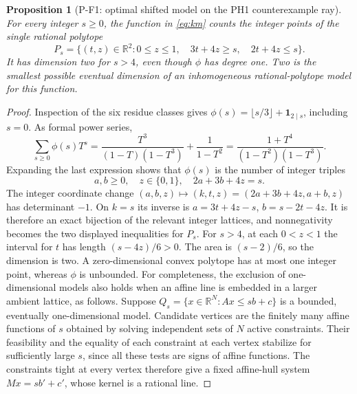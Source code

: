 \documentclass[11pt,a4paper]{article}
\newtheorem{proposition}{Proposition}[section]
\begin{document}
\begin{proposition}[P-F1: optimal shifted model on the PH1 counterexample ray]
\label{prop:shiftedray}
For every integer $s\ge0$, the function in \eqref{eq:km} counts the integer
points of the single rational polytope
\[
 P_s=\{(t,z)\in\mathbb R^2:
 0\le z\le1,\quad 3t+4z\ge s,\quad 2t+4z\le s\}.
 \tag{P-F1}
\]
It has dimension two for $s>4$, even though $\phi$ has degree one.
Two is the smallest possible eventual dimension of an inhomogeneous
rational-polytope model for this function.
\end{proposition}
\begin{proof}
Inspection of the six residue classes gives
$\phi(s)=\lfloor s/3\rfloor+\mathbf1_{2\mid s}$, including $s=0$.
As formal power series,
\[
 \sum_{s\ge0}\phi(s)T^s
 =\frac{T^3}{(1-T)(1-T^3)}+\frac1{1-T^2}
 =\frac{1+T^4}{(1-T^2)(1-T^3)}.
\]
Expanding the last expression shows that $\phi(s)$ is the number of
integer triples
\[
 a,b\ge0,\quad z\in\{0,1\},\quad 2a+3b+4z=s.
\]
The integer coordinate change
$(a,b,z)\mapsto(k,t,z)=(2a+3b+4z,a+b,z)$ has determinant $-1$.
On $k=s$ its inverse is
$a=3t+4z-s$, $b=s-2t-4z$.
It is therefore an exact bijection of the relevant integer lattices,
and nonnegativity becomes the two displayed inequalities for $P_s$.
For $s>4$, at each $0<z<1$ the interval for $t$ has length
$(s-4z)/6>0$. The area is $(s-2)/6$, so the dimension is two.
A zero-dimensional convex polytope has at most one integer point,
whereas $\phi$ is unbounded. For completeness, the exclusion of
one-dimensional models also holds when an affine line is embedded in
a larger ambient lattice, as follows. Suppose
$Q_s=\{x\in\mathbb R^N:Ax\le sb+c\}$ is a bounded, eventually
one-dimensional model. Candidate vertices are the finitely many affine
functions of $s$ obtained by solving independent sets of $N$ active
constraints. Their feasibility and the equality of each constraint at
each vertex stabilize for sufficiently large $s$, since all these tests
are signs of affine functions. The constraints tight at every vertex
therefore give a fixed affine-hull system $Mx=sb'+c'$, whose kernel is
a rational line.


\end{proof}
\end{document}
